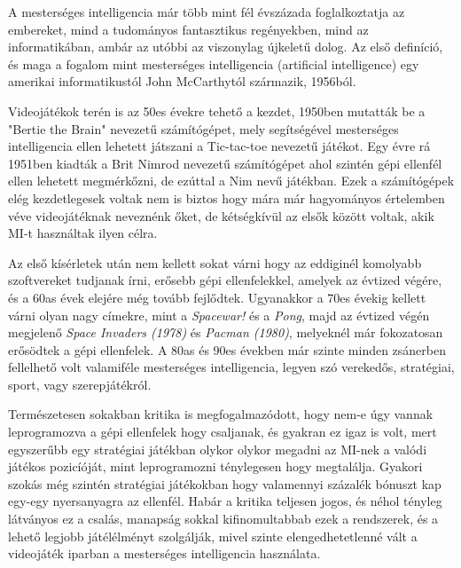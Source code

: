 
A mesterséges intelligencia már több mint fél évszázada foglalkoztatja az embereket, mind a tudományos fantasztikus regényekben, mind az informatikában, ambár az utóbbi az viszonylag újkeletű dolog. Az első definíció, és maga a fogalom mint mesterséges intelligencia (artificial intelligence) egy amerikai informatikustól John McCarthytól származik, 1956ból.

Videojátékok terén is az 50es évekre tehető a kezdet, 1950ben mutatták be a "Bertie the Brain" nevezetű számítógépet, mely segítségével mesterséges intelligencia ellen lehetett játszani a Tic-tac-toe nevezetű játékot. Egy évre rá 1951ben kiadták a Brit Nimrod nevezetű számítógépet ahol szintén gépi ellenfél ellen lehetett megmérkőzni, de ezúttal a Nim nevű játékban.
Ezek a számítógépek elég kezdetlegesek voltak nem is biztos hogy mára már hagyományos értelemben véve videojátéknak neveznénk őket, de kétségkívül az elsők között voltak, akik MI-t használtak ilyen célra.

Az első kísérletek után nem kellett sokat várni hogy az eddiginél komolyabb szoftvereket tudjanak írni, erősebb gépi ellenfelekkel, amelyek az évtized végére, és a 60as évek elejére még tovább fejlődtek. Ugyanakkor a 70es évekig kellett várni olyan nagy címekre, mint a \textit{Spacewar!} és a \textit{Pong}, majd az évtized végén megjelenő \textit{ Space Invaders (1978)} és \textit{Pacman (1980)}, melyeknél már fokozatosan erősödtek a gépi ellenfelek.
A 80as és 90es években már szinte minden zsánerben fellelhető volt valamiféle mesterséges intelligencia, legyen szó verekedős, stratégiai, sport, vagy szerepjátékról.

Természetesen sokakban kritika is megfogalmazódott, hogy nem-e úgy vannak leprogramozva a gépi ellenfelek hogy csaljanak, és gyakran ez igaz is volt, mert egyszerűbb egy stratégiai játékban olykor olykor megadni az MI-nek a valódi játékos pozicíóját, mint leprogramozni ténylegesen hogy megtalálja. Gyakori szokás még szintén stratégiai játékokban hogy valamennyi százalék bónuszt kap egy-egy nyersanyagra az ellenfél. Habár a kritika teljesen jogos, és néhol tényleg látványos ez a csalás, manapság sokkal kifinomultabbab ezek a rendszerek, és a lehető legjobb játélélményt szolgálják, mivel szinte elengedhetetlenné vált a videojáték iparban a mesterséges intelligencia használata.

